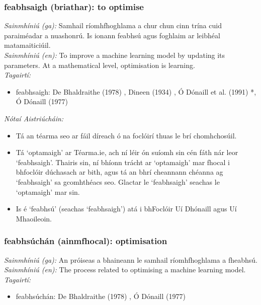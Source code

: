 \documentclass{article}
\begin{document}
\subsubsection*{feabhsaigh (briathar): to optimise}
 \noindent \textit{Sainmhíniú (ga):} Samhail ríomhfhoghlama a chur chun cinn trína cuid paraiméadar a nuashonrú. Is ionann feabhsú agus foghlaim ar leibhéal matamaiticiúil.
\\
 \noindent \textit{Sainmhíniú (en):} To improve a machine learning model by updating its parameters. At a mathematical level, optimisation is learning.
\\
 \noindent \textit{Tagairtí:}
\begin{itemize}
	\item feabhsaigh: De Bhaldraithe (1978) \cite{de-bhaldraithe}, Dineen (1934) \cite{dineen}, Ó Dónaill et al. (1991) \cite{focloir-beag}*, Ó Dónaill (1977) \cite{odonaill}
\end{itemize}

 \noindent \textit{Nótaí Aistriúcháin:}
\begin{itemize}
	\item Tá an téarma seo ar fáil díreach ó na foclóirí thuas le brí chomhchosúil.
	\item Tá `optamaigh' ar Téarma.ie, ach ní léir ón suíomh sin cén fáth nár leor `feabhsaigh'. Thairis sin, ní bhíonn trácht ar `optamaigh' mar fhocal i bhfoclóir dúchasach ar bith, agus tá an bhrí cheannann chéanna ag `feabhsaigh' sa gcomhthéacs seo. Glactar le `feabhsaigh' seachas le `optamaigh' mar sin.
	\item Is é `feabhsú' (seachas `feabhsaigh') atá i bhFoclóir Uí Dhónaill agus Uí Mhaoileoin.
\end{itemize}


\subsubsection*{feabhsúchán (ainmfhocal): optimisation}
 \noindent \textit{Sainmhíniú (ga):} An próiseas a bhaineann le samhail ríomhfhoghlama a fheabhsú.
\\
 \noindent \textit{Sainmhíniú (en):} The process related to optimising a machine learning model.
\\
 \noindent \textit{Tagairtí:}
\begin{itemize}
	\item feabhsúchán: De Bhaldraithe (1978) \cite{de-bhaldraithe}, Ó Dónaill (1977) \cite{odonaill}
\end{itemize}
\end{document}
